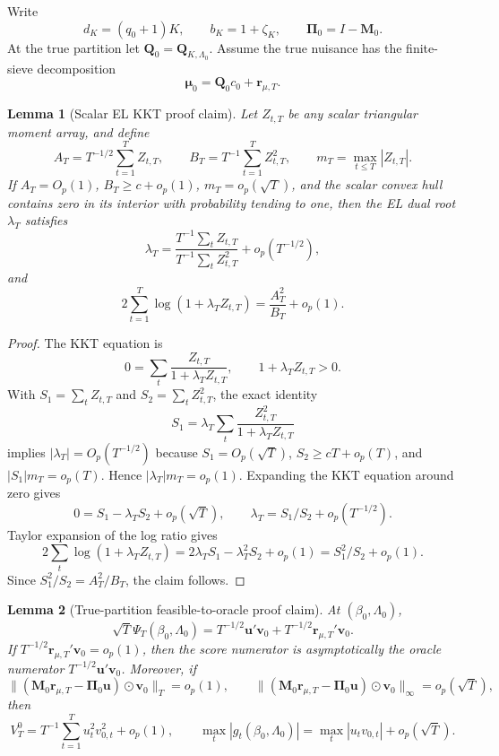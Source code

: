 \documentclass[12pt]{article}
\numberwithin{equation}{section}
\newtheorem{lemma}{Lemma}
\theoremstyle{definition}
\newcommand{\op}{o_p}
\newcommand{\Op}{O_p}
\begin{document}
Write
\[
    d_K=(q_0+1)K,\qquad b_K=1+\zeta_K,
    \qquad \bm\Pi_0=I-\bm M_0.
\]
At the true partition let \(\bm Q_0=\bm Q_{K,\Lambda_0}\). Assume the true
nuisance has the finite-sieve decomposition
\[
    \bm\mu_0=\bm Q_0c_0+\bm r_{\mu,T}.
\]

\begin{lemma}[Scalar EL KKT proof claim]
\label{lem:part2-scalar-el-proof-claim}
Let \(Z_{t,T}\) be any scalar triangular moment array, and define
\[
    A_T=T^{-1/2}\sum_{t=1}^T Z_{t,T},\qquad
    B_T=T^{-1}\sum_{t=1}^T Z_{t,T}^2,\qquad
    m_T=\max_{t\le T}|Z_{t,T}|.
\]
If \(A_T=\Op(1)\), \(B_T\ge c+\op(1)\), \(m_T=\op(\sqrt T)\), and the scalar
convex hull contains zero in its interior with probability tending to one, then
the EL dual root \(\lambda_T\) satisfies
\[
    \lambda_T=\frac{T^{-1}\sum_t Z_{t,T}}{T^{-1}\sum_t Z_{t,T}^2}
    +\op(T^{-1/2}),
\]
and
\[
    2\sum_{t=1}^T\log(1+\lambda_TZ_{t,T})
    =\frac{A_T^2}{B_T}+\op(1).
\]
\end{lemma}

\begin{proof}
The KKT equation is
\[
    0=\sum_t\frac{Z_{t,T}}{1+\lambda_TZ_{t,T}},
    \qquad 1+\lambda_TZ_{t,T}>0.
\]
With \(S_1=\sum_tZ_{t,T}\) and \(S_2=\sum_tZ_{t,T}^2\), the exact identity
\[
    S_1=\lambda_T\sum_t\frac{Z_{t,T}^2}{1+\lambda_TZ_{t,T}}
\]
implies \(|\lambda_T|=\Op(T^{-1/2})\) because
\(S_1=\Op(\sqrt T)\), \(S_2\ge cT+\op(T)\), and
\(|S_1|m_T=\op(T)\). Hence \(|\lambda_T|m_T=\op(1)\). Expanding the KKT
equation around zero gives
\[
    0=S_1-\lambda_TS_2+\op(\sqrt T),
    \qquad
    \lambda_T=S_1/S_2+\op(T^{-1/2}).
\]
Taylor expansion of the log ratio gives
\[
    2\sum_t\log(1+\lambda_TZ_{t,T})
    =2\lambda_TS_1-\lambda_T^2S_2+\op(1)
    =S_1^2/S_2+\op(1).
\]
Since \(S_1^2/S_2=A_T^2/B_T\), the claim follows.
\end{proof}

\begin{lemma}[True-partition feasible-to-oracle proof claim]
\label{lem:part2-feasible-oracle-proof-claim}
At \((\beta_0,\Lambda_0)\),
\[
    \sqrt T\Psi_T(\beta_0,\Lambda_0)
    =T^{-1/2}\bm u'\bm v_0
     +T^{-1/2}\bm r_{\mu,T}'\bm v_0.
\]
If \(T^{-1/2}\bm r_{\mu,T}'\bm v_0=\op(1)\), then the score numerator is
asymptotically the oracle numerator \(T^{-1/2}\bm u'\bm v_0\). Moreover, if
\[
    \|(\bm M_0\bm r_{\mu,T}-\bm\Pi_0\bm u)\odot\bm v_0\|_T=\op(1),
    \qquad
    \|(\bm M_0\bm r_{\mu,T}-\bm\Pi_0\bm u)\odot\bm v_0\|_\infty=\op(\sqrt T),
\]
then
\[
    V_T^0=T^{-1}\sum_{t=1}^T u_t^2v_{0,t}^2+\op(1),
    \qquad
    \max_t|g_t(\beta_0,\Lambda_0)|
    =\max_t|u_tv_{0,t}|+\op(\sqrt T).
\]
\end{lemma}
\end{document}
